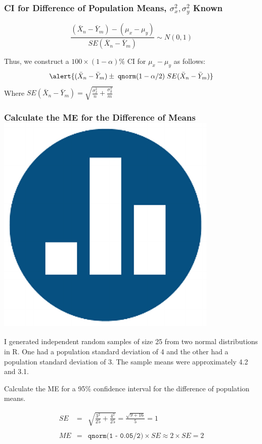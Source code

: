 \documentclass[handout]{beamer}
\begin{document}
\begin{frame}
\frametitle{CI for Difference of Population Means, $\sigma_x^2, \sigma_y^2$ Known}
	$$\frac{(\bar{X}_n - \bar{Y}_m) - (\mu_x -\mu_y)}{SE(\bar{X}_n - \bar{Y}_m)} \sim N(0,1)$$
	
	\vspace{1em}

Thus, we construct a $100\times(1-\alpha)\%$ CI for $\mu_x - \mu_y$ as follows:
	$$\alert{(\bar{X}_n - \bar{Y}_m) \pm \; \texttt{qnorm}(1-\alpha/2) \; SE(\bar{X}_n - \bar{Y}_m)}$$
Where $SE(\bar{X}_n - \bar{Y}_m) = \sqrt{\displaystyle\frac{\sigma_x^2}{n} + \frac{\sigma_y^2}{m} }$
\end{frame}
\begin{frame}
\frametitle{Calculate the ME for the Difference of Means \hfill \includegraphics[scale = 0.05]{./images/clicker}}
I generated independent random samples of size 25 from two normal distributions in R. One had a population standard deviation of 4 and the other had a population standard deviation of 3. The sample means were approximately 4.2 and 3.1.

\vspace{1em}
\alert{Calculate the ME for a 95\% confidence interval for the difference of population means.}

\pause
\begin{eqnarray*}
	SE &=& \sqrt{\frac{3^2}{25} + \frac{4^2}{25}} = \frac{\sqrt{9 + 16}}{5} = 1\\  \\
	ME &=& \texttt{qnorm(1 - 0.05/2)} \times SE \approx 2 \times SE = 2
\end{eqnarray*}

\end{frame}
\end{document}
